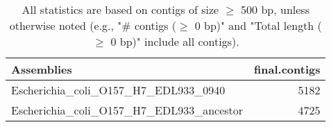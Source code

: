 \documentclass[12pt,a4paper]{article}
\begin{document}
\begin{table}[ht]
\begin{center}
\caption{All statistics are based on contigs of size $\geq$ 500 bp, unless otherwise noted (e.g., "\# contigs ($\geq$ 0 bp)" and "Total length ($\geq$ 0 bp)" include all contigs).}
\begin{tabular}{|l*{1}{|r}|}
\hline
Assemblies & final.contigs \\ \hline
Escherichia\_coli\_O157\_H7\_EDL933\_0940 & 5182 \\ \hline
Escherichia\_coli\_O157\_H7\_EDL933\_ancestor & 4725 \\ \hline
\end{tabular}
\end{center}
\end{table}
\end{document}

